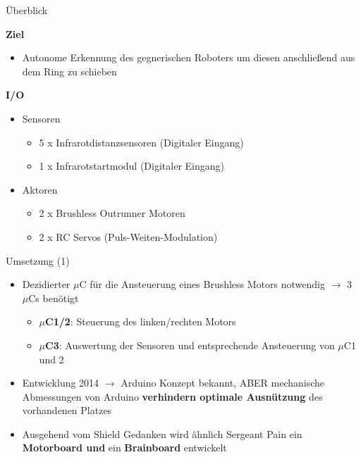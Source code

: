 \documentclass{beamer}
\begin{document}
\begin{frame}{\"Uberblick}
\begin{large}\textbf{Ziel}\end{large}
\begin{itemize}
	\item Autonome Erkennung des gegnerischen Roboters um diesen anschlie\ss{}end aus dem Ring zu schieben
\end{itemize}
\vspace{20px}
\begin{large}\textbf{I/O}\end{large}
\begin{itemize}
	\item Sensoren
	\begin{itemize}
		\item 5 x Infrarotdistanzsensoren (Digitaler Eingang)
		\item 1 x Infrarotstartmodul (Digitaler Eingang)
	\end{itemize}
	\item Aktoren
	\begin{itemize}
		\item 2 x Brushless Outrunner Motoren
		\item 2 x RC Servos (Puls-Weiten-Modulation)
	\end{itemize}
\end{itemize}
\end{frame}
\begin{frame}{Umsetzung (1)}
\begin{itemize}
	\item Dezidierter $\mu$C f\"ur die Ansteuerung eines Brushless Motors notwendig $\rightarrow$ 3 $\mu$Cs ben\"otigt
	\begin{itemize}
		\item \textbf{$\mu$C1/2}: Steuerung des linken/rechten Motors
		\item \textbf{$\mu$C3}: Auswertung der Sensoren und entsprechende Ansteuerung von $\mu$C1 und 2
	\end{itemize}
\end{itemize}
\begin{itemize}
	\item Entwicklung 2014 $\rightarrow$ Arduino Konzept bekannt, ABER mechanische Abmessungen von Arduino \textbf{verhindern optimale Ausn\"utzung} des vorhandenen Platzes
\end{itemize}
\begin{itemize}
	\item Ausgehend vom Shield Gedanken wird \"ahnlich Sergeant Pain ein \textbf{Motorboard und} ein \textbf{Brainboard} entwickelt
\end{itemize}
\end{frame}
\end{document}
